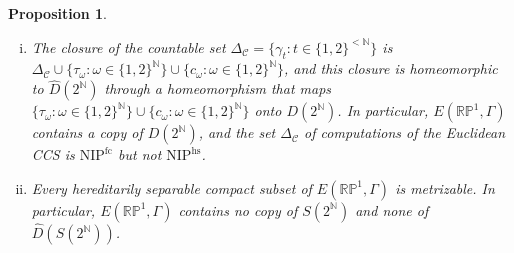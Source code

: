 \documentclass[psamsfonts]{amsart}
\newtheorem{prop}[thm]{Proposition}
\theoremstyle{definition}
\theoremstyle{remark}
\newcommand{\NIP}{\text{NIP}}
\newcommand{\RP}{\mathbb{R}\mathbb{P}}
\numberwithin{equation}{section}
\begin{document}
\begin{prop}\label{prop:euclid-duplicate}
\begin{enumerate}[(i)]
\item
  The closure of the countable set $\Delta_{\mathcal{C}}=\{\gamma_t:t\in\{1,2\}^{<\mathbb{N}}\}$ is $\Delta_{\mathcal{C}}\cup\{\tau_\omega:\omega\in\{1,2\}^{\mathbb{N}}\}\cup\{c_\omega:\omega\in\{1,2\}^{\mathbb{N}}\}$, and this closure is homeomorphic to $\hat D(2^{\mathbb{N}})$ through a homeomorphism that maps $\{\tau_\omega:\omega\in\{1,2\}^{\mathbb{N}}\}\cup\{c_\omega:\omega\in\{1,2\}^{\mathbb{N}}\}$ onto $D(2^{\mathbb{N}})$.
  In particular, $E(\RP^1,\Gamma)$ contains a copy of $D(2^{\mathbb{N}})$, and the set $\Delta_{\mathcal{C}}$ of computations of the Euclidean CCS is $\NIP^{\mathrm{fc}}$ but not $\NIP^{\mathrm{hs}}$.
\item
  Every hereditarily separable compact subset of $E(\RP^1,\Gamma)$ is metrizable.
  In particular, $E(\RP^1,\Gamma)$ contains no copy of $S(2^{\mathbb{N}})$ and none of $\hat D(S(2^{\mathbb{N}}))$.
\end{enumerate}
\end{prop}
\end{document}
